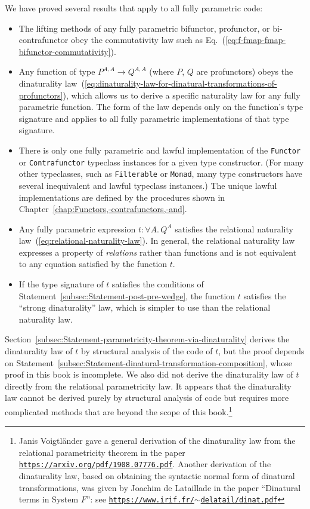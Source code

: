 We have proved several results that apply to all fully parametric
code:
\begin{itemize}
\item The lifting methods of any fully parametric bifunctor, profunctor,
or bi-contrafunctor obey the commutativity law such as Eq.~(\ref{eq:f-fmap-fmap-bifunctor-commutativity}). 
\item Any function of type $P^{A,A}\rightarrow Q^{A,A}$ (where $P$, $Q$
are profunctors) obeys the dinaturality law~(\ref{eq:dinaturality-law-for-dinatural-transformations-of-profunctors}),
which allows us to derive a specific naturality law for any fully
parametric function. The form of the law depends only on the function\textsf{'}s
type signature and applies to all fully parametric implementations
of that type signature. 
\item There is only one fully parametric and lawful implementation of the
\lstinline!Functor! or \lstinline!Contrafunctor! typeclass instances
for a given type constructor. (For many other typeclasses, such as
\lstinline!Filterable! or \lstinline!Monad!, many type constructors
have several inequivalent and lawful typeclass instances.) The unique
lawful implementations are defined by the procedures shown in Chapter~\ref{chap:Functors,-contrafunctors,-and}.
\item Any fully parametric expression $t:\forall A.\,Q^{A}$ satisfies the
relational naturality law~(\ref{eq:relational-naturality-law}).
In general, the relational naturality law expresses a property of
\emph{relations} rather than functions and is not equivalent to any
equation satisfied by the function $t$. 
\item If the type signature of $t$ satisfies the conditions of Statement~\ref{subsec:Statement-post-pre-wedge},
the function $t$ satisfies the \textsf{``}strong dinaturality\textsf{''} law, which
is simpler to use than the relational naturality law.
\end{itemize}
Section~\ref{subsec:Statement-parametricity-theorem-via-dinaturality}
derives the dinaturality law of $t$ by structural analysis of the
code of $t$, but the proof depends on Statement~\ref{subsec:Statement-dinatural-transformation-composition},
whose proof in this book is incomplete. We also did not derive the
dinaturality law of $t$ directly from the relational parametricity
law. It appears that the dinaturality law cannot be derived purely
by structural analysis of code but requires more complicated methods
that are beyond the scope of this book.\footnote{Janis Voigtl\"ander gave a general
derivation of the dinaturality law from the relational parametricity
theorem in the paper \texttt{\href{https://arxiv.org/pdf/1908.07776.pdf}{https://arxiv.org/pdf/1908.07776.pdf}}.
Another derivation of the dinaturality law, based on obtaining the
syntactic normal form of dinatural transformations, was given by Joachim
de Lataillade in the paper \textsf{``}Dinatural
terms in System $F$\textsf{''}: see \texttt{\href{https://www.irif.fr/~delatail/dinat.pdf}{https://www.irif.fr/$\sim$delatail/dinat.pdf}}} 

